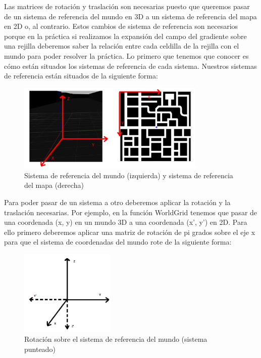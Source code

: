 Las matrices de rotación y traslación son necesarias puesto que queremos pasar de un sistema de referencia del mundo en 3D a un sistema de referencia del mapa en 2D o, al contrario. Estos cambios de sistema de referencia son necesarios porque en la práctica si realizamos la expansión del campo del gradiente sobre una rejilla deberemos saber la relación entre cada celdilla de la rejilla con el mundo para poder resolver la práctica. Lo primero que tenemos que conocer es cómo están situados los sistemas de referencia de cada sistema. Nuestros sistemas de referencia están situados de la siguiente forma:

\begin{figure}[H]
  \begin{center}
    \includegraphics[width=0.8\textwidth]{figures/GPP/referencias.png}
		\caption{Sistema de referencia del mundo (izquierda) y sistema de referencia del mapa (derecha)}
		\label{fig.sistemaref}
		\end{center}
\end{figure}

Para poder pasar de un sistema a otro deberemos aplicar la rotación y la traslación necesarias. Por ejemplo, en la función WorldGrid tenemos que pasar de una coordenada (x, y) en un mundo 3D a una coordenada (x’, y’) en 2D. Para ello primero deberemos aplicar una matriz de rotación de pi grados sobre el eje x para que el sistema de coordenadas del mundo rote de la siguiente forma:

\begin{figure}[H]
  \begin{center}
    \includegraphics[width=0.4\textwidth]{figures/GPP/Sistema3DRot.png}
		\caption{Rotación sobre el sistema de referencia del mundo (sistema punteado)}
		\label{fig.sistema3DRot}
		\end{center}
\end{figure}

